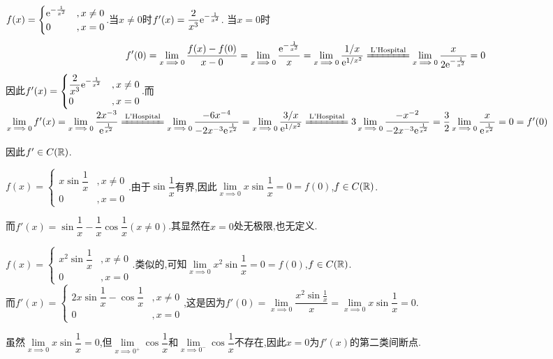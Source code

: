 \documentclass[UTF8]{book}
\begin{document}
    \begin{example}
        \(f(x)=\begin{cases}
            \mathrm{e}^{-\frac{1}{x^2}}&,x\neq 0\\ 0&,x=0
        \end{cases}\).当$x\neq 0$时$f'(x)=\dfrac{2}{x^3}\mathrm{e}^{-\frac{1}{x^2}}$. 当$x=0$时
        \[f'(0)=\lim_{x\implies 0}\frac{f(x)-f(0)}{x-0}=\lim_{x\implies 0}\frac{\e^{-\frac{1}{x^2}}}{x}=\lim_{x\implies 0}\frac{1/x}{\e^{1/x^2}}\xlongequal{\text{L'Hospital}}\lim_{x\implies 0}\frac{x}{2\e^{-\frac{1}{x^2}}}=0\]
        因此\(f'(x)=\begin{cases}
            \dfrac{2}{x^3}\mathrm{e}^{-\frac{1}{x^2}}&,x\neq 0\\ 0&,x=0
        \end{cases}\).而$\lim\limits_{x\implies 0}f'(x)=\lim\limits_{x\implies 0}\dfrac{2x^{-3}}{\e^{\frac{1}{x^2}}}\xlongequal{\text{L'Hospital}}\lim\limits_{x\implies 0} \dfrac{-6x^{-4}}{-2x^{-3}\e^{\frac{1}{x^2}}}=\lim\limits_{x\implies 0} \dfrac{3/x}{\e^{1/x^2}}\\ \xlongequal{\text{L'Hospital}}3\lim\limits_{x\implies 0} \dfrac{-x^{-2}}{-2x^{-3}\e^{\frac{1}{x^2}}}=\dfrac{3}{2}\lim\limits_{x\implies 0} \dfrac{x}{\e^{\frac{1}{x^2}}}=0=f'(0)$

        因此$f'\in C(\mathbb{R})$.
    \end{example}\begin{example}
        \(f(x)=\begin{cases}
            x\sin \dfrac{1}{x}&,x\neq 0\\ 0&,x=0
        \end{cases}\).由于$\sin\dfrac{1}{x}$有界,因此$\lim\limits_{x\implies 0} x\sin \dfrac{1}{x}=0=f(0)$,$f\in C(\mathbb{R})$.

        而$f'(x)=\sin \dfrac{1}{x}-\dfrac{1}{x}\cos\dfrac{1}{x} (x\neq 0)$.其显然在$x=0$处无极限,也无定义.
    \end{example}\begin{example}
        \(f(x)=\begin{cases}
            x^2\sin \dfrac{1}{x}&,x\neq 0\\ 0&,x=0
        \end{cases}\).类似的,可知$\lim\limits_{x\implies 0} x^2\sin \dfrac{1}{x}=0=f(0)$,$f\in C(\mathbb{R})$.\\ 而\(f'(x)=\begin{cases}
            2x\sin \dfrac{1}{x}-\cos\dfrac{1}{x}&,x\neq 0\\ 0&,x=0
        \end{cases}\),这是因为$f'(0)=\lim\limits_{x\implies 0} \dfrac{x^2\sin \frac{1}{x}}{x}=\lim\limits_{x\implies 0} x\sin \dfrac{1}{x}=0$.

        虽然$\lim\limits_{x\implies 0} x\sin \dfrac{1}{x}=0$,但$\lim\limits_{x\implies 0^+} \cos\dfrac{1}{x}$和$\lim\limits_{x\implies 0^-} \cos\dfrac{1}{x}$不存在,因此$x=0$为$f'(x)$的第二类间断点.
    \end{example}
\end{document}
